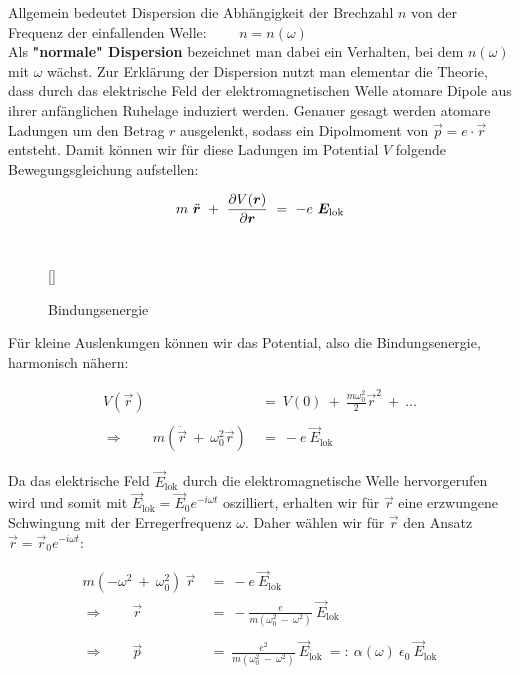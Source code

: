 Allgemein bedeutet Dispersion die Abhängigkeit der Brechzahl $n$ von der Frequenz der einfallenden Welle: $\qquad n = n (\omega)$\\
Als \textbf{"normale" Dispersion} bezeichnet man dabei ein Verhalten, bei dem $n(\omega)$ mit $\omega$ wächst.
Zur Erklärung der Dispersion nutzt man elementar die Theorie, dass  durch das elektrische Feld der elektromagnetischen Welle atomare Dipole aus ihrer anfänglichen Ruhelage induziert werden. Genauer gesagt werden atomare Ladungen um den Betrag $r$ ausgelenkt, sodass ein Dipolmoment von $\vec{p}=e\cdot\vec{r}$ entsteht.
\newpage
Damit können  wir für diese Ladungen im Potential $V$ folgende Bewegungsgleichung aufstellen:

\begin{equation*}
m \ \ddot{\vec{r}} \ + \ \pdiff{V(\vec{r})}{\vec{r}} \ = \ -e \ \vec{E}_{\text{lok}}
\end{equation*}
\ \\
\begin{wrapfigure}[10]{l}[0cm]{0cm}
	\raisebox{0pt}[\dimexpr{}\baselineskip\relax]{
		\colorbox{hgrey}{
		}
	}
	\caption{Bindungsenergie}
\end{wrapfigure}

Für kleine Auslenkungen können wir das Potential, also die Bindungsenergie, harmonisch nähern:

\begin{align*}
V(\vec{r})  \ &= \ V(0) \ + \ \frac{m\omega_0^2}{2}\vec{r}^2 \ + \ \ldots\\
\ \\
\Rightarrow \qquad m \left(\ddot{\vec{r}} \ + \ \omega_0^2\vec{r}\right)  \ &= \ - e \ \vec{E}_{\text{lok}}
\end{align*}

Da das elektrische Feld $\vec{E}_{\text{lok}}$ durch die elektromagnetische Welle hervorgerufen wird und somit mit $\vec{E}_{\text{lok}} = \vec{E}_0 e^{-i\omega t}$ oszilliert, erhalten wir für $\vec{r}$ eine erzwungene Schwingung mit der Erregerfrequenz $\omega$. Daher wählen wir für $\vec{r}$ den Ansatz $\vec{r}= \vec{r}_0 e^{-i\omega t}$:

\begin{align*}
m\left(-\omega^2 \ + \ \omega_0^2\right) \ \vec{r}  \ &= \ -e \ \vec{E}_{\text{lok}}\\
\Rightarrow \qquad \vec{r}  \ &= \ -\frac{e}{m\left(\omega^2_0 \ - \ \omega^2\right)} \ \vec{E}_{\text{lok}}\\
\ \\
\Rightarrow \qquad \vec{p}  \ &= \ \frac{e^2}{m\left(\omega_0^2 \ - \ \omega^2\right)} \ \vec{E}_{\text{lok}}  \ =: \ \alpha (\omega) \ \epsilon_0 \ \vec{E}_{\text{lok}}
\end{align*}

